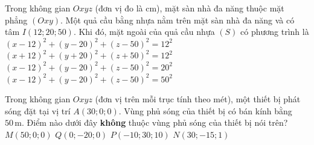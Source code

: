 

\begin{ex}%
	Trong không gian $Oxyz$ (đơn vị đo là cm), mặt sàn nhà đa năng thuộc mặt phẳng $(Oxy)$. Một quả cầu bằng nhựa nằm trên mặt sàn nhà đa năng và có tâm $I(12; 20; 50)$. Khi đó, mặt ngoài của quả cầu nhựa $(S)$ có phương trình là 
	 \choice
		{$(x-12)^2+(y-20)^2+(z-50)^2=12^2$} 
		{$(x+12)^2+(y+20)^2+(z+50)^2=12^2$} 
		 {$(x-12)^2+(y-20)^2+(z-50)^2=20^2$}
		{\True $(x-12)^2+(y-20)^2+(z-50)^2=50^2$} 
\end{ex}

\begin{ex}%
	Trong không gian $Oxyz$ (đơn vị trên mỗi trục tính theo mét), một thiết bị phát sóng đặt tại vị trí $A(30; 0; 0)$. Vùng phủ sóng của thiết bị có bán kính bằng $ 50  \mathrm{\,m} $. Điểm nào dưới đây \textbf{không} thuộc vùng phủ sóng của thiết bị nói trên?
	\choice 
		{$M(50;  0; 0)$}
		{$Q(0;-20;  0)$}
		{\True $P(-10; 30;  10)$}
		{$N(30;-15;  1)$}
\end{ex}


